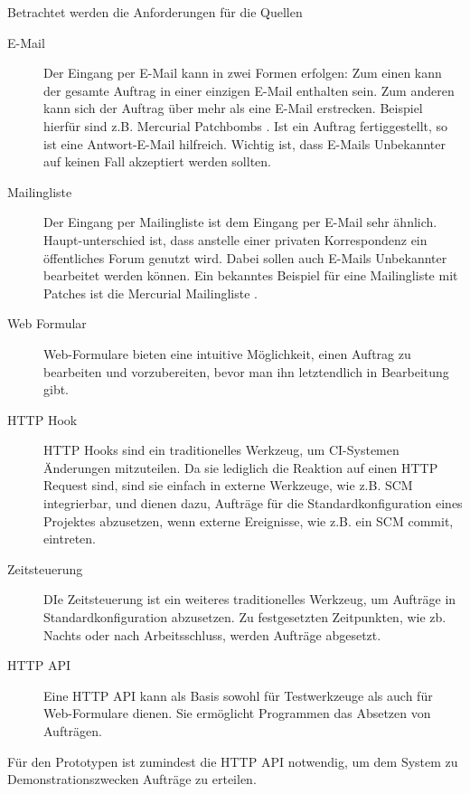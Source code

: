 Betrachtet werden die Anforderungen für die Quellen
\begin{description}
    \item[E-Mail]
        Der Eingang per E-Mail kann in zwei Formen erfolgen:
        Zum einen kann der gesamte Auftrag in einer einzigen E-Mail enthalten sein.
        Zum anderen kann sich der Auftrag über mehr als eine E-Mail erstrecken.
        Beispiel hierfür sind z.B. Mercurial Patchbombs \cite{mercurial:patchbomb}.
        Ist ein Auftrag fertiggestellt, so ist eine Antwort-E-Mail hilfreich.
        Wichtig ist, dass E-Mails Unbekannter auf keinen Fall
        akzeptiert werden sollten.
    \item[Mailingliste]
        Der Eingang per Mailingliste ist dem Eingang per E-Mail sehr ähnlich.
        Haupt-unterschied ist, dass anstelle einer privaten Korrespondenz
        ein öffentliches Forum genutzt wird. Dabei sollen auch E-Mails Unbekannter 
        bearbeitet werden können.
        Ein bekanntes Beispiel für eine Mailingliste mit Patches
        ist die Mercurial Mailingliste \cite{mercurial:mailingliste}.
    \item[Web Formular]
        Web-Formulare bieten eine intuitive Möglichkeit,
        einen Auftrag zu bearbeiten und vorzubereiten,
        bevor man ihn letztendlich in Bearbeitung gibt.
    \item[HTTP Hook]
        HTTP Hooks sind ein traditionelles Werkzeug,
        um \ac{CI}-Systemen Änderungen mitzuteilen.
        Da sie lediglich die Reaktion auf einen HTTP Request sind,
        sind sie einfach in externe Werkzeuge, wie z.B. \ac{SCM} integrierbar,
        und dienen dazu, Aufträge für die Standardkonfiguration
        eines Projektes abzusetzen, wenn externe Ereignisse,
        wie z.B. ein SCM commit, eintreten.
    \item[Zeitsteuerung]
        DIe Zeitsteuerung ist ein weiteres traditionelles Werkzeug,
        um Aufträge in Standardkonfiguration abzusetzen.
        Zu festgesetzten Zeitpunkten, wie zb. Nachts oder nach
        Arbeitsschluss, werden Aufträge abgesetzt.
    \item[HTTP API]
        Eine HTTP API kann als Basis sowohl für Testwerkzeuge
        als auch für Web-Formulare dienen.
        Sie ermöglicht Programmen das Absetzen von Aufträgen.
\end{description}

Für den Prototypen ist zumindest die HTTP API notwendig,
um dem System zu Demonstrationszwecken Aufträge zu erteilen.


